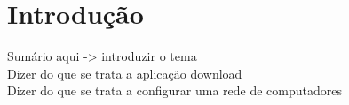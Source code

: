 \section*{Introdução}
Sumário aqui -> introduzir o tema\\
Dizer do que se trata a aplicação download\\
Dizer do que se trata a configurar uma rede de computadores